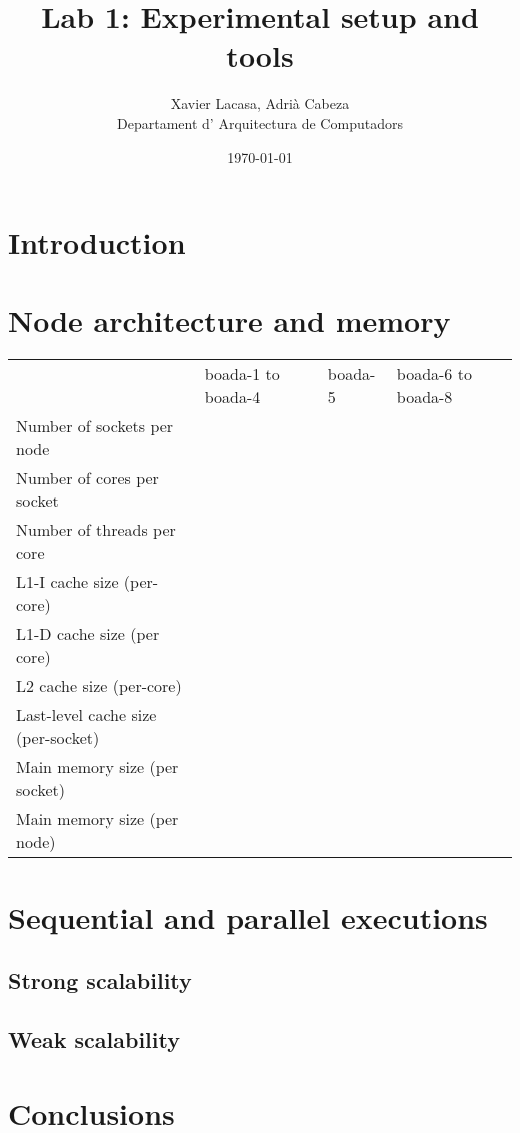 \documentclass[12]{article}
\author{Xavier Lacasa, Adrià Cabeza \\ Departament d' Arquitectura de Computadors}
\title{Lab 1: Experimental setup and tools}
\date{\today}
\begin{document}
\maketitle
\newpage
\tableofcontents

\newpage
\section{Introduction}
\section{Node architecture and memory}



\begin{table}[h]
    \begin{tabular}{llll}
                               & boada-1 to boada-4 & boada-5 & boada-6 to boada-8   \\
    Number of sockets per node &                    &         &                      \\
    Number of cores per socket &                    &         &                      \\
    Number of threads per core &                    &         &                     \\
    L1-I cache size (per-core) &                    &         &                      \\
    L1-D cache size (per core) &                    &         &                      \\
    L2 cache size (per-core)   &                    &         &                       \\
    Last-level cache size (per-socket) &            &         &                      \\
    Main memory  size (per socket) &                &         &                       \\
    Main memory size (per node)  &                    &         &                       \\
    \end{tabular}
\end{table}




\section{Sequential and parallel executions}
\subsection{Strong scalability}
\subsection{Weak scalability}
\section{Conclusions}
\end{document}

